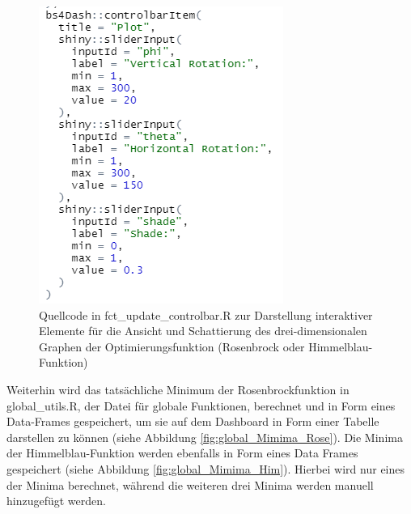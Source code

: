 \begin{figure}[H]
 \centering
 \includegraphics[scale=.7]{"images/04_Visualisierung_des_Algorithmus/ui_slider_for_rose_him_plots_2.png"}
 \caption{Quellcode in fct\_update\_controlbar.R zur Darstellung interaktiver Elemente für die Ansicht und Schattierung des drei-dimensionalen Graphen der Optimierungsfunktion (Rosenbrock oder Himmelblau-Funktion)}
 \label{fig:ui_RoseHimPlot_2}
\end{figure}

Weiterhin wird das tatsächliche Minimum der Rosenbrockfunktion in global\_utils.R, der Datei für globale Funktionen, berechnet und in Form eines Data-Frames gespeichert, um sie auf dem Dashboard in Form einer Tabelle darstellen zu können (siehe Abbildung \ref{fig:global_Mimima_Rose}). Die Minima der Himmelblau-Funktion werden ebenfalls in Form eines Data Frames gespeichert (siehe Abbildung \ref{fig:global_Mimima_Him}). Hierbei wird nur eines der Minima berechnet, während die weiteren drei Minima werden manuell hinzugefügt werden. 

